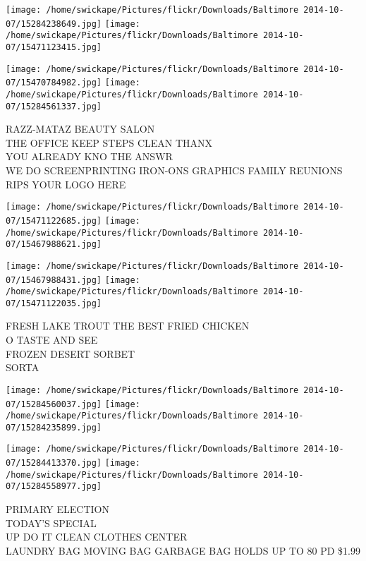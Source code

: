 \documentclass[10pt,letterpaper]{article}
\begin{document}
\texttt{[image: /home/swickape/Pictures/flickr/Downloads/Baltimore 2014-10-07/15284238649.jpg]}
\texttt{[image: /home/swickape/Pictures/flickr/Downloads/Baltimore 2014-10-07/15471123415.jpg]}

\texttt{[image: /home/swickape/Pictures/flickr/Downloads/Baltimore 2014-10-07/15470784982.jpg]}
\texttt{[image: /home/swickape/Pictures/flickr/Downloads/Baltimore 2014-10-07/15284561337.jpg]}

RAZZ{-}MATAZ BEAUTY SALON\\
THE OFFICE KEEP STEPS CLEAN THANX\\
YOU ALREADY KNO THE ANSWR\\
WE DO SCREENPRINTING IRON{-}ONS GRAPHICS FAMILY REUNIONS RIPS YOUR LOGO HERE\\
\pagebreak

\texttt{[image: /home/swickape/Pictures/flickr/Downloads/Baltimore 2014-10-07/15471122685.jpg]}
\texttt{[image: /home/swickape/Pictures/flickr/Downloads/Baltimore 2014-10-07/15467988621.jpg]}

\texttt{[image: /home/swickape/Pictures/flickr/Downloads/Baltimore 2014-10-07/15467988431.jpg]}
\texttt{[image: /home/swickape/Pictures/flickr/Downloads/Baltimore 2014-10-07/15471122035.jpg]}

FRESH LAKE TROUT THE BEST FRIED CHICKEN\\
O TASTE AND SEE\\
FROZEN DESERT SORBET\\
SORTA\\
\pagebreak

\texttt{[image: /home/swickape/Pictures/flickr/Downloads/Baltimore 2014-10-07/15284560037.jpg]}
\texttt{[image: /home/swickape/Pictures/flickr/Downloads/Baltimore 2014-10-07/15284235899.jpg]}

\texttt{[image: /home/swickape/Pictures/flickr/Downloads/Baltimore 2014-10-07/15284413370.jpg]}
\texttt{[image: /home/swickape/Pictures/flickr/Downloads/Baltimore 2014-10-07/15284558977.jpg]}

PRIMARY ELECTION\\
TODAY'S SPECIAL\\
UP DO IT CLEAN CLOTHES CENTER\\
LAUNDRY BAG MOVING BAG GARBAGE BAG HOLDS UP TO 80 PD \$1.99\\
\pagebreak
\end{document}
